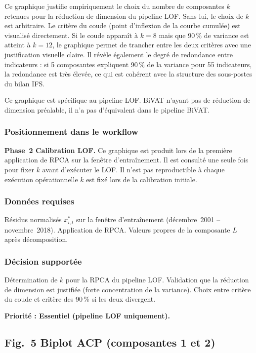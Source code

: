 \documentclass[12pt,a4paper]{article}
\begin{document}
Ce graphique justifie empiriquement le choix du nombre de composantes $k$
retenues pour la réduction de dimension du pipeline LOF. Sans lui, le
choix de $k$ est arbitraire. Le critère du coude (point d'inflexion de
la courbe cumulée) est visualisé directement. Si le coude apparaît à
$k = 8$ mais que 90\,\% de variance est atteint à $k = 12$, le graphique
permet de trancher entre les deux critères avec une justification visuelle
claire. Il révèle également le degré de redondance entre indicateurs : si
5 composantes expliquent 90\,\% de la variance pour 55 indicateurs, la
redondance est très élevée, ce qui est cohérent avec la structure des
sous-postes du bilan IFS.

Ce graphique est spécifique au pipeline LOF. BiVAT n'ayant pas de réduction
de dimension préalable, il n'a pas d'équivalent dans le pipeline BiVAT.

\subsubsection{Positionnement dans le workflow}

\textbf{Phase~2  Calibration LOF.} Ce graphique est produit lors de la
première application de RPCA sur la fenêtre d'entraînement. Il est consulté
une seule fois pour fixer $k$ avant d'exécuter le LOF. Il n'est pas
reproductible à chaque exécution opérationnelle  $k$ est fixé lors de
la calibration initiale.

\subsubsection{Données requises}

Résidus normalisés $x_{i,t}^*$ sur la fenêtre d'entraînement
(décembre~2001 -- novembre~2018). Application de RPCA. Valeurs propres
de la composante $L$ après décomposition.

\subsubsection{Décision supportée}

Détermination de $k$ pour la RPCA du pipeline LOF. Validation que la
réduction de dimension est justifiée (forte concentration de la variance).
Choix entre critère du coude et critère des 90\,\% si les deux divergent.

\textbf{Priorité : Essentiel (pipeline LOF uniquement).}

\subsection{Fig.~5  Biplot ACP (composantes 1 et 2)}
\end{document}
